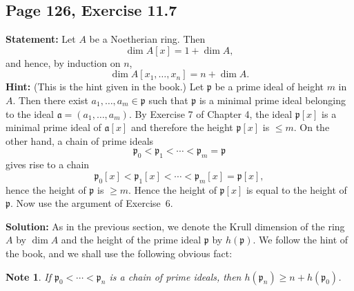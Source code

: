 \documentclass[parskip=half,fontsize=12pt]{scrartcl}%
\newcommand{\oo}{\operatorname}\newcommand{\ooo}{\operatorname*}
\newcommand{\mf}{\mathfrak}
\newcommand{\aaa}{\mf a}
\newcommand{\ppp}{\mf p}
\newtheorem{note}[thm]{Note}
\begin{document}
%
\begin{comment}
implies that, for any chain $\ppp_0<\ppp_1<\ppp_2$ of prime ideals in $A[x]$, we have:

$\bullet$ if $\ppp_0^{\oo c}=\ppp_1^{\oo c}$ then $\ppp_0=\ppp_0^{\oo c}[x]$ %
and $\ppp_1^{\oo c}<\ppp_2^{\oo c}$,

$\bullet$ if $\ppp_1^{\oo c}=\ppp_2^{\oo c}$ then $\ppp_1=\ppp_1^{\oo c}[x]$ %
and $\ppp_0^{\oo c}<\ppp_1^{\oo c}$.

This implies that a chain of length $\ell$ in $A[x]$ contracts to a chain of length at least $\lfloor\ell/2\rfloor$ in $A$. Hence 
$$
\left\lfloor\frac{\dim A[x]}2\right\rfloor\le\dim A,
$$ 
that is,
$$
\frac{\dim A[x]}2\le\frac12+\dim A.\ \square
$$
\end{comment}
%
\subsection{Page 126, Exercise 11.7}%

\textbf{Statement:} Let $A$ be a Noetherian ring. Then
\begin{equation}\label{dax}
\dim A[x]=1+\dim A,
\end{equation}
and hence, by induction on $n$,
$$
\dim A[x_1,\ldots,x_n]=n+\dim A.
$$ 
\textbf{Hint:} (This is the hint given in the book.) Let $\ppp$ be a prime ideal of height $m$ in $A$. Then there exist $a_1,\ldots,a_m\in\ppp$ such that $\ppp$ is a minimal prime ideal belonging to the ideal $\aaa=(a_1,\ldots,a_m)$. By Exercise 7 of Chapter 4, the ideal $\ppp[x]$ is a minimal prime ideal of $\aaa[x]$ and therefore the height $\ppp[x]$ is $\le m$. On the other hand, a chain of prime ideals 
$$
\ppp_0<\ppp_1<\cdots<\ppp_m=\ppp
$$ 
gives rise to a chain 
$$
\ppp_0[x]<\ppp_1[x]<\cdots<\ppp_m[x]=\ppp[x],
$$ 
hence the height of $\ppp$ is $\ge m$. Hence the height of $\ppp[x]$ is equal to the height of $\ppp$. Now use the argument of Exercise~6.

\textbf{Solution:} As in the previous section, we denote the Krull dimension of the ring $A$ by $\dim A$ and the height of the prime ideal $\ppp$ by $h(\ppp)$. We follow the hint of the book, and we shall use the following obvious fact: 

\begin{note}\label{116a}
If $\ppp_0<\cdots<\ppp_n$ is a chain of prime ideals, then $h(\ppp_n)\ge n+h(\ppp_0)$. 
\end{note}
\end{document}
